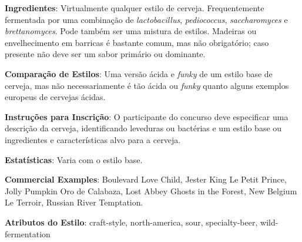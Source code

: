 \textbf{Ingredientes}: Virtualmente qualquer estilo de cerveja. Frequentemente fermentada por uma combinação de \textit{lactobacillus}, \textit{pediococcus}, \textit{saccharomyces} e \textit{brettanomyces}. Pode também ser uma mistura de estilos. Madeiras ou envelhecimento em barricas é bastante comum, mas não obrigatório; caso presente não deve ser um sabor primário ou dominante.

\textbf{Comparação de Estilos}: Uma versão ácida e \textit{funky} de um estilo base de cerveja, mas não necessariamente é tão ácida ou \textit{funky} quanto alguns exemplos europeus de cervejas ácidas.

\textbf{Instruções para Inscrição}: O participante do concurso deve especificar uma descrição da cerveja, identificando leveduras ou bactérias e um estilo base ou ingredientes e características alvo para a cerveja.

\textbf{Estatísticas}: Varia com o estilo base.

\textbf{Commercial Examples}: Boulevard Love Child, Jester King Le Petit Prince, Jolly Pumpkin Oro de Calabaza, Lost Abbey Ghosts in the Forest, New Belgium Le Terroir, Russian River Temptation.

\textbf{Atributos do Estilo}: craft-style, north-america, sour, specialty-beer, wild-fermentation
